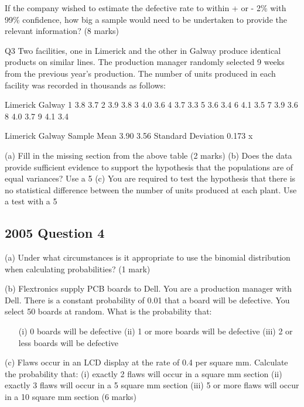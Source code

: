 \documentclass[]{report}
\begin{document}
\begin{enumerate}[(i)]
\begin{itemize}
If the company wished to estimate the defective rate to within + or - 2\% with 99\% confidence, how big a sample would need to be undertaken to provide the relevant information?
(8 marks)




Q3
Two facilities, one in Limerick and the other in Galway produce identical products on similar lines.  The production manager randomly selected 9 weeks from the previous year’s production.  The number of units produced in each facility was recorded in thousands as follows:

Limerick	Galway
1	3.8	3.7
2	3.9	3.8
3	4.0	3.6
4	3.7	3.3
5	3.6	3.4
6	4.1	3.5
7	3.9	3.6
8	4.0	3.7
9	4.1	3.4



Limerick	Galway
Sample Mean	3.90	3.56
Standard Deviation	0.173	x

(a)	Fill in the missing section from the above table			(2 marks)
(b)	Does the data provide sufficient evidence to support the hypothesis that the populations are of equal variances?  Use a 5%
(c)	You are required to test the hypothesis that there is no statistical difference between the number of units produced at each plant.  Use a test with a 5%


\subsection{2005 Question 4}
(a)	Under what circumstances is it appropriate to use the binomial distribution when calculating probabilities?					(1 mark)

(b) 	Flextronics supply PCB boards to Dell.  You are a production manager with Dell.  There is a constant probability of 0.01 that a board will be defective.  You select 50 boards at random.  What is the probability that:
\begin{itemize}
	\item[(i)]	0 boards will be defective
	(ii)	1 or more boards will be defective
	(iii)	2 or less boards will be defective			
\end{itemize}	
	
	
	(c)	Flaws occur in an LCD display at the rate of 0.4 per square mm.  Calculate the probability that:
	(i)	exactly 2 flaws will occur in a square mm section
	(ii)	exactly 3 flaws will occur in a 5 square mm section
	(iii)	5 or more flaws will occur in a 10 square mm section
	(6 marks)
	



\end{itemize}
\end{enumerate}
\end{document}
